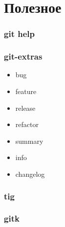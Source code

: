 \section{Полезное}
\label{sec-6}
\begin{frame}
\frametitle{git help}
\label{sec-6-1}
\end{frame}
\begin{frame}
\frametitle{git-extras}
\label{sec-6-2}
\begin{itemize}

\item bug
\label{sec-6-2-1}%

\item feature
\label{sec-6-2-2}%

\item release
\label{sec-6-2-3}%

\item refactor
\label{sec-6-2-4}%

\item summary
\label{sec-6-2-5}%

\item info
\label{sec-6-2-6}%

\item changelog
\label{sec-6-2-7}%
\end{itemize} %
\end{frame}
\begin{frame}
\frametitle{tig}
\label{sec-6-3}
\end{frame}
\begin{frame}
\frametitle{gitk}
\label{sec-6-4}
\end{frame}


